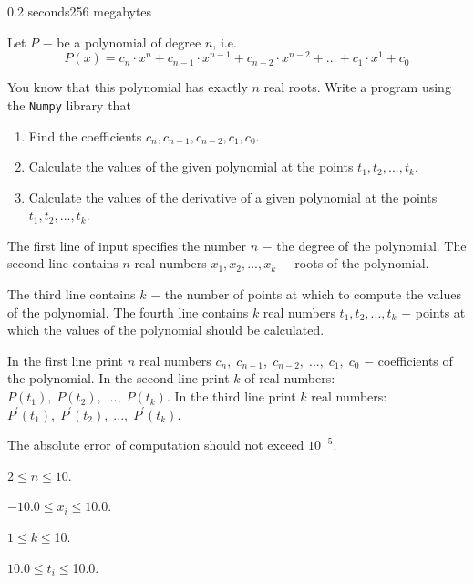 \begin{problem}{}{}{}{0.2 seconds}{256 megabytes}


Let $P$ $-$ be a polynomial of degree $n$, i.e.
$$
  P(x) = c_n \cdot x^n + c_{n-1} \cdot x^{n-1} + c_{n-2} \cdot x^{n-2} + \dots + c_{1} \cdot x^{1} + c_{0} 
$$


You know that this polynomial has exactly $n$ real roots.
Write a program using the \texttt{Numpy} library that
\begin{enumerate}
 \item Find the coefficients $c_n, c_{n-1}, c_{n-2}, c_{1}, c_{0}$.
 \item Calculate the values of the given polynomial at the points $t_1, t_2, ..., t_k$.
 \item Calculate the values of the derivative of a given polynomial at the points $t_1, t_2, ..., t_k$.
\end{enumerate}




\InputFile
The first line of input specifies the number $n$ $-$ the degree of the polynomial.
The second line contains $n$ real numbers $x_1, x_2, ..., x_k$ $-$ roots of the polynomial.

The third line contains $k$ $-$ the number of points at which to compute the values of the polynomial.
The fourth line contains $k$ real numbers $t_1, t_2, ..., t_k$ $-$ points at which the values of the polynomial should be calculated.


\OutputFile
In the first line print $n$ real numbers $c_n,\; c_{n-1}, \; c_{n-2}, \; ..., \; c_{1}, \; c_{0}$ $-$ coefficients of the polynomial.
In the second line print $k$ of real numbers: $P(t_1), \; P(t_2),\; ...,\; P(t_k)$.
In the third line print $k$ real numbers: $P^\prime(t_1),\; P^\prime(t_2), \; ..., \; P^\prime(t_k)$.


The absolute error of computation should not exceed $10^{-5}$.


\Constraints
$2 \le n \le 10$.

$-10.0 \le x_i \le 10.0$.

$1 \le k \le $10.

$10.0 \le t_i \le $10.0.

\Examples
\begin{example}
%
%
\end{example}


\end{problem}

